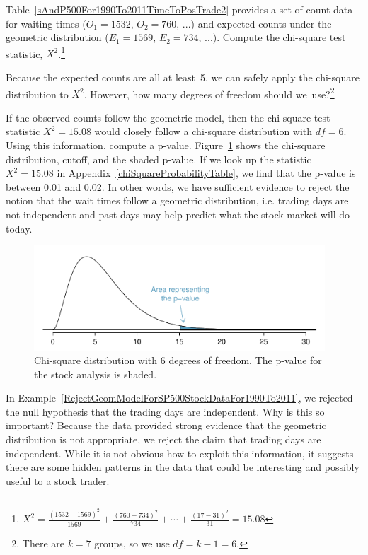 \begin{exercise}
Table~\ref{sAndP500For1990To2011TimeToPosTrade2} provides a set of count data for waiting times ($O_1=1532$, $O_2=760$, ...) and expected counts under the geometric distribution ($E_1=1569$, $E_2=734$, ...). Compute the chi-square test statistic, $X^2$.\footnote{$X^2=\frac{(1532-1569)^2}{1569} + \frac{(760-734)^2}{734} + \cdots + \frac{(17-31)^2}{31} = 15.08$}
\end{exercise}

\begin{exercise}
Because the expected counts are all at least~5, we can safely apply the chi-square distribution to $X^2$. However, how many degrees of freedom should we~use?\footnote{There are $k=7$ groups, so we use $df=k-1=6$.}
\end{exercise}

\begin{example}{If the observed counts follow the geometric model, then the chi-square test statistic $X^2=15.08$ would closely follow a chi-square distribution with $df=6$. Using this information, compute a p-value.} \label{RejectGeomModelForSP500StockDataFor1990To2011}
Figure~\ref{geomFitPValueForSP500For1990To2011} shows the chi-square distribution, cutoff, and the shaded p-value. If we look up the statistic $X^2=15.08$ in Appendix~\ref{chiSquareProbabilityTable}, we find that the p-value is between 0.01 and 0.02. In other words, we have sufficient evidence to reject the notion that the wait times follow a geometric distribution, i.e. trading days are not independent and past days may help predict what the stock market will do today.
\end{example}

\begin{figure}
\centering
\includegraphics[width=0.97\textwidth]{06/figures/geomFitPValueForSP500For1990To2011/geomFitPValueForSP500For1990To2011}
\caption{Chi-square distribution with 6 degrees of freedom. The p-value for the stock analysis is shaded.}
\label{geomFitPValueForSP500For1990To2011}
\end{figure}

\begin{example}{In Example~\ref{RejectGeomModelForSP500StockDataFor1990To2011}, we rejected the null hypothesis that the trading days are independent. Why is this so important?}
Because the data provided strong evidence that the geometric distribution is not appropriate, we reject the claim that trading days are independent. While it is not obvious how to exploit this information, it suggests there are some hidden patterns in the data that could be interesting and possibly useful to a stock trader.
\end{example}




